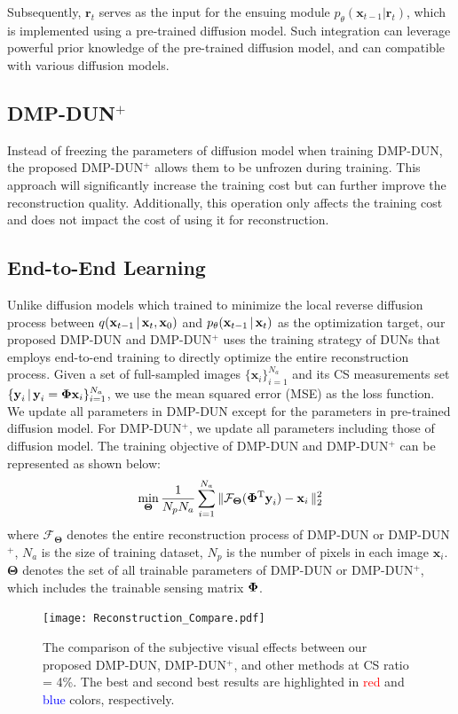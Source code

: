 \documentclass[10pt,twocolumn,letterpaper]{article}
\begin{document}
Subsequently, $\mathbf{r}_t$ serves as the input for the ensuing module $p_\theta (\mathbf{x}_{t-1}|\mathbf{r}_t)$, which is implemented using a pre-trained diffusion model. Such integration can leverage powerful prior knowledge of the pre-trained diffusion model, and can compatible with various diffusion models.

\subsection{DMP-DUN$^+$}
Instead of freezing the parameters of diffusion model when training DMP-DUN, the proposed DMP-DUN$^+$ allows them to be unfrozen during training. This approach will significantly increase the training cost but can further improve the reconstruction quality. Additionally, this operation only affects the training cost and does not impact the cost of using it for reconstruction.

\subsection{End-to-End Learning} \label{subsec:e2e}
Unlike diffusion models which trained to minimize the local reverse diffusion process between $q(\operatorname{\mathbf{x}}_{t-1}|\operatorname{\mathbf{x}}_t, \operatorname{\mathbf{x}}_0)$ and $p_\theta(\operatorname{\mathbf{x}}_{t-1}|\operatorname{\mathbf{x}}_t)$ as the optimization target, our proposed DMP-DUN and DMP-DUN$^+$ uses the training strategy of DUNs that employs end-to-end training to directly optimize the entire reconstruction process. Given a set of full-sampled images $\{\mathbf{x}_i\}_{i=1}^{N_a}$ and its CS measurements set $\{\operatorname{\mathbf{y}}_i|\operatorname{\mathbf{y}}_i = \operatorname{\mathbf{\Phi x}}_i\}_{i=1}^{N_a}$, we use the mean squared error (MSE) as the loss function. We update all parameters in DMP-DUN except for the parameters in pre-trained diffusion model. For DMP-DUN$^+$, we update all parameters including those of diffusion model. The training objective of DMP-DUN and DMP-DUN$^+$ can be represented as shown below:
\begin{equation}
	\min\limits_\mathbf{\Theta} \frac{1}{N_p N_a}\sum^{N_a}_{i=1}\| \mathcal{F}_\mathbf{\Theta}(\operatorname{\mathbf{\Phi}^T \mathbf{y}}_i) - \operatorname{\mathbf{x}}_i \|_2^2 \label{eq:loss} 
\end{equation}
where $\mathcal{F}_\mathbf{\Theta}$ denotes the entire reconstruction process of DMP-DUN or DMP-DUN$^+$, $N_a$ is the size of training dataset, $N_p$ is the number of pixels in each image $\mathbf{x}_i$. $\mathbf{\Theta}$ denotes the set of all trainable parameters of DMP-DUN or DMP-DUN$^+$, which includes the trainable sensing matrix $\operatorname{\mathbf{\Phi}}$.


\begin{figure}[t]
	\centering
	\texttt{[image: Reconstruction\_Compare.pdf]}
	\caption{The comparison of the subjective visual effects between our proposed DMP-DUN, DMP-DUN$^+$, and other methods at CS ratio = 4\%. The best and second best results are highlighted in \textcolor{red}{red} and \textcolor{blue}{blue} colors, respectively.
	}
	\label{fig:reconstruction_compare}
\end{figure}
\end{document}
